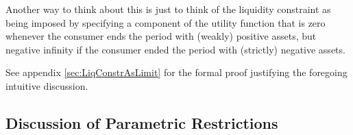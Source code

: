 \documentclass[BufferStockTheory]{subfiles}
\begin{document}
Another way to think about this is just to think of the liquidity
constraint as being imposed by specifying a component of the utility
function that is zero whenever the consumer ends the period with
(weakly) positive assets, but negative infinity if the consumer
ended the period with (strictly) negative assets.

See appendix \ref{sec:LiqConstrAsLimit} for the formal proof justifying the
foregoing intuitive discussion.

\hypertarget{Discussion-of-Parametric-Restrictions}{}
\subsection{Discussion of Parametric Restrictions}\label{sec:discussConvergence}

\end{document}
